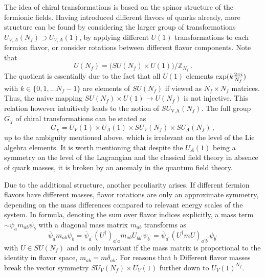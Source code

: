 The idea of chiral transformations is based on the spinor structure of the fermionic fields. Having introduced different flavors of quarks already, more structure can be found by considering the larger group of transformations ${U_{V,A}(N_f)\supset U_{V,A}(1)}$, by applying different $U(1)$ transformations to each fermion flavor, or consider rotations between different flavor components. Note that
\begin{equation}
    U(N_f)=\big(SU(N_f)\times U(1)\big)/\mathbb{Z}_{N_f}\,.
\end{equation}
The quotient is essentially due to the fact that all ${U(1)}$ elements ${\exp(k\frac{2\pi{i}}{N_f})}$ with ${k\in\{0,1,\dots N_f-1\}}$ are elements of ${SU(N_f)}$ if viewed as ${N_f\times N_f}$ matrices. Thus, the naive mapping ${SU(N_f)\times U(1)\to U(N_f)}$ is not injective. This relation however intuitively leads to the notion of ${SU_\text{V,A}(N_f)}$. The full group ${G_\chi}$ of chiral transformations can be stated as
\begin{equation}
    G_\chi=U_V(1)\times U_A(1)\times SU_V(N_f)\times SU_A(N_f)\,,
\end{equation}
up to the ambiguity mentioned above, which is irrelevant on the level of the Lie algebra elements. It is worth mentioning that despite the $U_A(1)$ being a symmetry on the level of the Lagrangian and the classical field theory in absence of quark masses, it is broken by an anomaly in the quantum field theory.

Due to the additional structure, another peculiarity arises. If different fermion flavors have different masses, flavor rotations are only an approximate symmetry, depending on the mass differences compared to relevant energy scales of the system. In formula, denoting the sum over flavor indices explicitly, a mass term ${\sim\overline{\psi}_am_{ab}\psi_b}$ with a diagonal mass matrix $m_{ab}$ transforms as
\begin{equation}
    \overline{\psi}_am_{ab}\psi_b=\overline{\psi}_{a^\prime}(U^\dagger)_{a^\prime a}m_{ab}U_{bb^\prime}\psi_{b^\prime}=\overline{\psi}_{a^\prime}(U^\dagger mU)_{a^\prime b^\prime}\psi_{b^\prime}
\end{equation}
with ${U\in SU(N_f)}$ and is only invariant if the mass matrix is proportional to the identity in flavor space, ${m_{ab}=m\delta_{ab}}$. For reasons that b Different flavor masses break the vector symmetry ${SU_V(N_f)\times U_V(1)}$ further down to ${U_V(1)^{N_f}}$.

